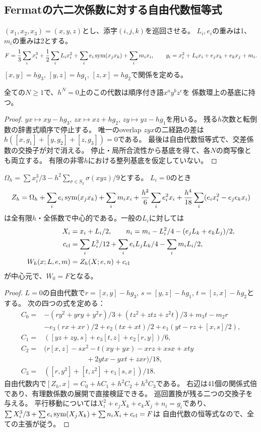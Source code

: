 \subsection{Fermatの六二次係数に対する自由代数恒等式}
$(x_1,x_2,x_3)=(x,y,z)$とし、添字$(i,j,k)$を巡回させる。
$L_i,e_i$の重みは1、$m_i$の重みは2とする。
\[
 F=\frac13\sum_i x_i^3+\frac12\sum_iL_ix_i^2
       +\sum_i e_i\operatorname{sym}(x_jx_k)+\sum_i m_ix_i,
 \qquad g_i=x_i^2+L_ix_i+e_jx_k+e_kx_j+m_i.
\]
$[x,y]=hg_3$, $[y,z]=hg_1$, $[z,x]=hg_2$で関係を定める。
\begin{lemma}[全Artin商での形式PBW]
全ての$N\ge1$で、$h^N=0$上のこの代数は順序付き語$x^ay^bz^c$を
係数環上の基底に持つ。
\end{lemma}
\begin{proof}
$yx\mapsto xy-hg_3$, $zx\mapsto xz+hg_2$, $zy\mapsto yz-hg_1$を用いる。
残る$h$次数と転倒数の辞書式順序で停止する。
唯一のoverlap $zyx$の二経路の差は
$h([x,g_1]+[y,g_2]+[z,g_3])=0$である。
最後は自由代数恒等式で、交差係数の交換子が対で消える。
停止・局所合流性から基底を得て、各$N$の商写像とも両立する。
有限の非零$h$における整列基底を仮定していない。
\end{proof}
\begin{theorem}[四次補正で止まる全係数中心式]
\label{thm:pair-full-fermat-center}
$\Omega_h=\sum x_i^3/3-h^2\sum_{\sigma\in S_3}\sigma(xyz)/9$とする。
$L_i=0$のとき
\[
 Z_h=\Omega_h+\sum_i e_i\operatorname{sym}(x_jx_k)+\sum_i m_ix_i
       +\frac{h^2}{6}\sum_i e_i^2x_i
       +\frac{h^4}{18}\sum_i(e_ix_i^2-e_je_kx_i)
\]
は全有限$h$・全係数で中心的である。一般の$L_i$に対しては
\begin{align*}
 X_i&=x_i+L_i/2,\qquad
 n_i=m_i-L_i^2/4-(e_jL_k+e_kL_j)/2,\\
 c_{\rm cl}&=\sum_iL_i^3/12+\sum_ie_iL_jL_k/4-\sum_im_iL_i/2,\\
 W_h(x;L,e,m)&=Z_h(X;e,n)+c_{\rm cl}
\end{align*}
が中心元で、$W_0=F$となる。
\end{theorem}
\begin{proof}
$L=0$の自由代数で$r=[x,y]-hg_3$, $s=[y,z]-hg_1$, $t=[z,x]-hg_2$とする。
次の四つの式を定める：
\begin{align*}
 C_0={}&-(ry^2+yry+y^2r)/3+(tz^2+ztz+z^2t)/3+m_3t-m_2r\\
       &-e_3(rx+xr)/2+e_2(tx+xt)/2+e_1(yt-rz+[x,s]/2),\\
 C_1={}&([yz+zy,s]+e_3[t,z]+e_2[r,y])/6,\\
 C_2={}&(r[x,z]-sx^2-t(xy+yx)-xrz+xsx+xty\\
       &\hspace{6em}+2ytx-yxt+zxr)/18,\\
 C_3={}&([r,y^2]+[t,z^2]+e_1[s,x])/18.
\end{align*}
自由代数内で$[Z_h,x]=C_0+hC_1+h^2C_2+h^3C_3$である。
右辺は41個の関係式倍であり、有理数係数の展開で直接検証できる。
巡回置換が残る二つの交換子を与える。
平行移動については$X_i^2+e_jX_k+e_kX_j+n_i=g_i$であり、
$\sum X_i^3/3+\sum e_i\operatorname{sym}(X_jX_k)+\sum n_iX_i+c_{\rm cl}=F$は
自由代数の恒等式なので、全ての主張が従う。
\end{proof}
